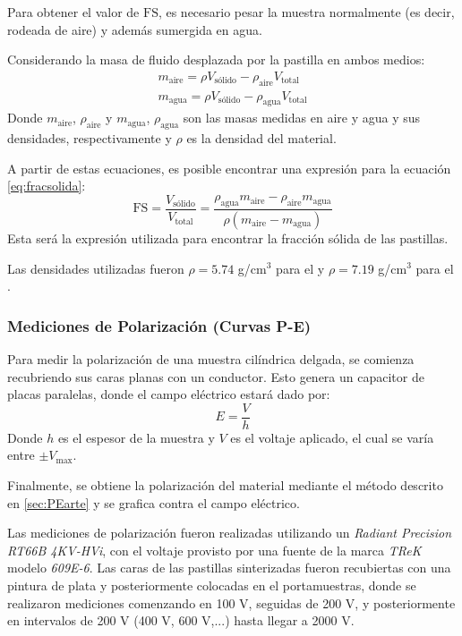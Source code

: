 \documentclass[../main.tex]{subfiles}
\begin{document}
Para obtener el valor de $\text{FS}$, es necesario pesar la muestra normalmente (es decir, rodeada de aire) y además sumergida en agua.

Considerando la masa de fluido desplazada por la pastilla en ambos medios:
\begin{equation}
    \begin{split}
        m_\text{aire}=\rho V_\text{sólido} - \rho_\text{aire} V_\text{total}\\
        m_\text{agua}=\rho V_\text{sólido} - \rho_\text{agua} V_\text{total}
    \end{split}
    \label{eq:masasaireagua}
\end{equation}
Donde $m_\text{aire}$, $\rho_\text{aire}$  y $m_\text{agua}$, $\rho_\text{agua}$ son las masas medidas en aire y agua y sus densidades, respectivamente y $\rho$ es la densidad del material.

A partir de estas ecuaciones, es posible encontrar una expresión para la ecuación \ref{eq:fracsolida}:
\begin{equation}
    \text{FS}=\dfrac{V_\text{sólido}}{V_\text{total}}=\dfrac{\rho_\text{agua}m_\text{aire}-\rho_\text{aire}m_\text{agua}}{\rho(m_\text{aire}-m_\text{agua})}
    \label{eq:fracsolidamasas}
\end{equation}
Esta será la expresión utilizada para encontrar la fracción sólida de las pastillas.

Las densidades utilizadas fueron $\rho=5.74$ g/cm$^3$ para el \neod{} \cite{densneod} y $\rho=7.19$ g/cm$^3$ para el \sama{} \cite{denssama}.

\subsubsection{Mediciones de Polarización (Curvas P-E)}
Para medir la polarización de una muestra cilíndrica delgada, se comienza recubriendo sus caras planas con un conductor. Esto genera un capacitor de placas paralelas, donde el campo eléctrico estará dado por:
\begin{equation}
    E=\dfrac{V}{h}
    \label{eq:campovoltaje}
\end{equation}
Donde $h$ es el espesor de la muestra y $V$ es el voltaje aplicado, el cual se varía entre $\pm V_\text{max}$.

Finalmente, se obtiene la polarización del material mediante el método descrito en \ref{sec:PEarte} y se grafica contra el campo eléctrico.

Las mediciones de polarización fueron realizadas utilizando un \textit{Radiant Precision RT66B 4KV-HVi}, con el voltaje provisto por una fuente de la marca \textit{TReK} modelo \textit{609E-6}. Las caras de las pastillas sinterizadas fueron recubiertas con una pintura de plata y posteriormente colocadas en el portamuestras, donde se realizaron mediciones comenzando en 100 V, seguidas de 200 V, y posteriormente en intervalos de 200 V (400 V, 600 V,...) hasta llegar a 2000 V.
\end{document}
